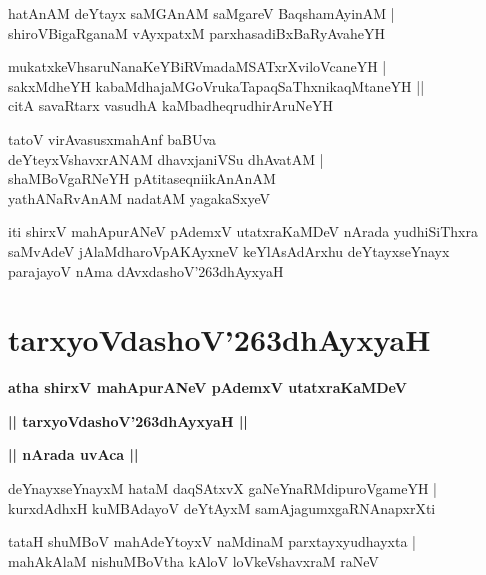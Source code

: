 \documentclass[twoside,12pt,openright]{book}
\def\S{\char'263}
\newcounter{shloka}[chapter]
\def\uvaca#1{\centerline{{\large\textbf{#1}}}}
\begin{document}
\begin{shloka}%
hatAnAM deYtayx saMGAnAM saMgareV BaqshamAyinAM |\\
shiroVBigaRganaM vAyxpatxM parxhasadiBxBaRyAvaheYH 
\end{shloka}

\begin{shloka}%
mukatxkeVhsaruNanaKeYBiRVmadaMSATxrXviloVcaneYH |\\
sakxMdheYH kabaMdhajaMGoVrukaTapaqSaThxnikaqMtaneYH ||\\
citA savaRtarx vasudhA kaMbadheqrudhirAruNeYH 
\end{shloka}

\begin{shloka}%
tatoV virAvasusxmahAnf baBUva \\
deYteyxVshavxrANAM dhavxjaniVSu dhAvatAM |\\
shaMBoVgaRNeYH pAtitaseqniikAnAnAM \\
yathANaRvAnAM nadatAM yagakaSxyeV 
\end{shloka}

\begin{center}
iti shirxV mahApurANeV pAdemxV utatxraKaMDeV  nArada yudhiSiThxra saMvAdeV jAlaMdharoVpAKAyxneV keYlAsAdArxhu 
deYtayxseYnayx parajayoV nAma dAvxdashoV\S dhAyxyaH 
\end{center}

\chapter{tarxyoVdashoV\S dhAyxyaH}

\begin{center}
{\LARGE\bfseries atha shirxV mahApurANeV pAdemxV utatxraKaMDeV} 
\end{center}

\begin{center}
{\LARGE\bfseries  || tarxyoVdashoV\S dhAyxyaH ||}
\end{center}

\uvaca{|| nArada uvAca ||}

\begin{shloka}%
deYnayxseYnayxM hataM daqSAtxvX gaNeYnaRMdipuroVgameYH |\\
kurxdAdhxH kuMBAdayoV deYtAyxM samAjagumxgaRNAnapxrXti 
\end{shloka}

\begin{shloka}%
tataH shuMBoV mahAdeYtoyxV naMdinaM parxtayxyudhayxta |\\
mahAkAlaM nishuMBoVtha kAloV loVkeVshavxraM raNeV 
\end{shloka}
\end{document}
